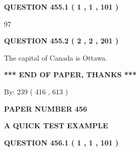 \documentclass[12pt]{article}
\begin{document}
{\textbf{\Large{QUESTION
455.1 
 ( 1 , 1 , 101 )
}}}
  
  
 
 
\noindent{}

97
 
 
  
\vspace{0.2in}
  
{\textbf{\Large{QUESTION
455.2 
 ( 2 , 2 , 201 )
}}}
  
  
 
 
\noindent{}
 
 
The capital of Canada is Ottawa.
 
 
 
 
   
   
 \vspace{0.2in}
 
   
   
   
   
\vspace{1.0in} 
{\textbf{\large{ *** END OF PAPER, THANKS *** }}} 
   
   
\hspace{1.0in} By: 
 239 ( 416 ,  613 )
   
   
   
   
\newpage 
\setcounter{page}{ 
   456001 } 
   
   
   
   
 {\textbf{ \Large{ PAPER NUMBER  456  }}}
   
   
\vspace{0.2in}
   
   
   
   
   
   
 \vspace{0.2in}
{\LARGE {\textbf{ A QUICK TEST EXAMPLE}}}
   
   
  
\vspace{0.2in}
  
{\textbf{\Large{QUESTION
456.1 
 ( 1 , 1 , 101 )
}}}
  
  
 
 
\noindent{}
\end{document}
